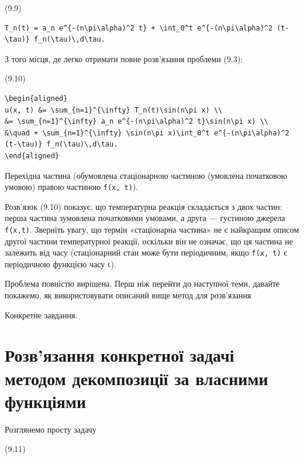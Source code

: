 \documentclass[
  ukrainian,
]{article}
\begin{document}
(9.9)

\begin{verbatim}
T_n(t) = a_n e^{-(n\pi\alpha)^2 t} + \int_0^t e^{-(n\pi\alpha)^2 (t-\tau)} f_n(\tau)\,d\tau.
\end{verbatim}

З того місця, де легко отримати повне розв'язання проблеми (9.3):

(9.10)

\begin{verbatim}
\begin{aligned}
u(x, t) &= \sum_{n=1}^{\infty} T_n(t)\sin(n\pi x) \\
&= \sum_{n=1}^{\infty} a_n e^{-(n\pi\alpha)^2 t}\sin(n\pi x) \\
&\quad + \sum_{n=1}^{\infty} \sin(n\pi x)\int_0^t e^{-(n\pi\alpha)^2 (t-\tau)} f_n(\tau)\,d\tau.
\end{aligned}
\end{verbatim}

Перехідна частина (обумовлена стаціонарною частиною (умовлена початковою
умовою) правою частиною \texttt{f(x,\ t)}).

Розв'язок (9.10) показує, що температурна реакція складається з двох
частин: перша частина зумовлена початковими умовами, а друга ---
густиною джерела \texttt{f(x,t)}. Зверніть увагу, що термін «стаціонарна
частина» не є найкращим описом другої частини температурної реакції,
оскільки він не означає, що ця частина не залежить від часу
(стаціонарний стан може бути періодичним, якщо \texttt{f(x,\ t)} є
періодичною функцією часу t).

Проблема повністю вирішена. Перш ніж перейти до наступної теми, давайте
покажемо, як використовувати описаний вище метод для розв'язання

Конкретне завдання.

\section{Розв'язання конкретної задачі методом декомпозиції за власними
функціями}\label{ux440ux43eux437ux432ux44fux437ux430ux43dux43dux44f-ux43aux43eux43dux43aux440ux435ux442ux43dux43eux457-ux437ux430ux434ux430ux447ux456-ux43cux435ux442ux43eux434ux43eux43c-ux434ux435ux43aux43eux43cux43fux43eux437ux438ux446ux456ux457-ux437ux430-ux432ux43bux430ux441ux43dux438ux43cux438-ux444ux443ux43dux43aux446ux456ux44fux43cux438}

Розглянемо просту задачу

(9.11)
\end{document}
